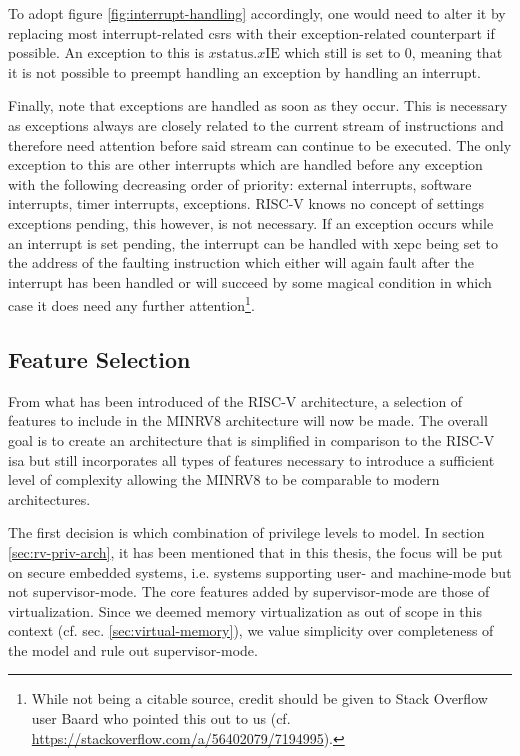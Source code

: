 To adopt figure \ref{fig:interrupt-handling} accordingly, one would need to alter it by replacing most interrupt-related \glspl{csr} with their exception-related counterpart if possible.
An exception to this is $ x\text{status}.x\text{IE} $ which still is set to 0, meaning that it is not possible to preempt handling an exception by handling an interrupt.

Finally, note that exceptions are handled as soon as they occur.
This is necessary as exceptions always are closely related to the current stream of instructions and therefore need attention before said stream can continue to be executed.
The only exception to this are other interrupts which are handled before any exception with the following decreasing order of priority: external interrupts, software interrupts, timer interrupts, exceptions.
RISC-V knows no concept of settings exceptions pending, this however, is not necessary.
If an exception occurs while an interrupt is set pending, the interrupt can be handled with \gls{xepc} being set to the address of the faulting instruction which either will again fault after the interrupt has been handled or will succeed by some magical condition in which case it does need any further attention\footnote{
    While not being a citable source, credit should be given to Stack Overflow user Baard who pointed this out to us (cf. \url{https://stackoverflow.com/a/56402079/7194995}).
}.

\subsection{Feature Selection}
\label{sec:risc-v-selection}

From what has been introduced of the RISC-V architecture, a selection of features to include in the MINRV8 architecture will now be made.
The overall goal is to create an architecture that is simplified in comparison to the RISC-V \gls{isa} but still incorporates all types of features necessary to introduce a sufficient level of complexity allowing the MINRV8 to be comparable to modern architectures.

The first decision is which combination of privilege levels to model.
In section \ref{sec:rv-priv-arch}, it has been mentioned that in this thesis, the focus will be put on secure embedded systems, i.e. systems supporting user- and machine-mode but not supervisor-mode.
The core features added by supervisor-mode are those of virtualization.
Since we deemed memory virtualization as out of scope in this context (cf. sec. \ref{sec:virtual-memory}), we value simplicity over completeness of the model and rule out supervisor-mode.

